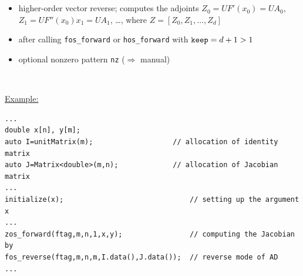 \documentclass[12pt,oneside,a4paper]{article}
\begin{document}
\begin{center}
\begin{minipage}[h]{14cm}
\end{minipage}\\[2ex]
%
\\[2ex]
\begin{minipage}[h]{14cm}
\small 
\begin{itemize}
\item higher-order vector reverse; computes the adjoints
      \mbox{$Z_0=U F'\left(x_0\right)=U A_0$},
      \mbox{$Z_1=U F''\left(x_0\right)x_1=U A_1$}, 
      \ldots, where $Z=[Z_0,Z_1,\ldots,Z_d]$
\item after calling  {\tt fos\_forward} or 
      {\tt hos\_forward} with $\text{\tt keep}=d+1>1$
\item optional nonzero pattern {\tt nz} ($\Rightarrow$ manual)
\end{itemize}
\end{minipage}\\[3ex]
%
\begin{minipage}[h]{160mm}
\small
\underline{Example:}
\begin{verbatim}
...
double x[n], y[m];
auto I=unitMatrix(m);                   // allocation of identity matrix
auto J=Matrix<double>(m,n);             // allocation of Jacobian matrix
...
initialize(x);                              // setting up the argument x
...
zos_forward(ftag,m,n,1,x,y);                // computing the Jacobian by
fos_reverse(ftag,m,n,m,I.data(),J.data());  // reverse mode of AD
...
\end{verbatim}
\end{minipage}
\end{center}
\end{document}
